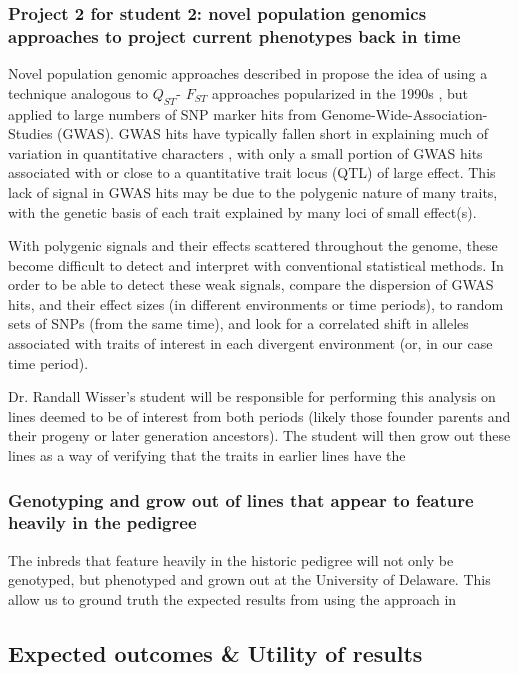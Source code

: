 \documentclass[12pt]{article}
\begin{document}
\subsubsection*{Project 2 for student 2: novel population genomics approaches to project current phenotypes back in time}
Novel population genomic approaches described in \cite{Berg:2014bs} propose the idea of using a technique analogous to $Q_{ST}$- $F_{ST}$ approaches popularized in the 1990s \citep{Latta:1998ek,  McKay:2002wi}, but applied to large numbers of SNP marker hits from Genome-Wide-Association-Studies (GWAS). 
GWAS hits have typically fallen short in explaining much of variation in quantitative characters \citep{Rockman:2011ej}, with only a small portion of GWAS hits associated with or close to a quantitative trait locus (QTL) of large effect. 
This lack of signal in GWAS hits may be due to the polygenic nature of many traits, with the genetic basis of each trait explained by many loci of small effect(s). 
\par With polygenic signals and their effects scattered throughout the genome, these become difficult to detect and interpret with conventional statistical methods. 
In order to be able to detect these weak signals, \cite{Berg:2014bs} compare the dispersion of GWAS hits, and their effect sizes (in different environments or time periods), to random sets of SNPs (from the same time), and look for a correlated shift in alleles associated with traits of interest in each divergent environment (or, in our case time period).
\par Dr. Randall Wisser's student will be responsible for performing this analysis on lines deemed to be of interest from both periods (likely those founder parents and their progeny or later generation ancestors). 
The student will then grow out these lines as a way of verifying that the traits in earlier lines have the 
\subsubsection*{Genotyping and grow out of lines that appear to feature heavily in the pedigree}
The inbreds that feature heavily in the historic pedigree will not only be genotyped, but phenotyped and grown out at the University of Delaware. This allow us to ground truth the expected results from using the approach in \cite{Berg:2014bs}


\subsection*{Expected outcomes \& Utility of results}
\end{document}
